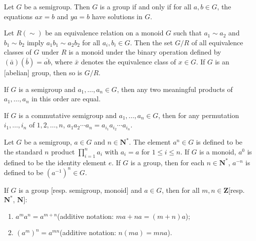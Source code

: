 \begin{proposition}
    Let $G$ be a semigroup. Then $G$ is a group if and only if for all $a,b\in G$, the equations $ax=b$ and $ya=b$ have solutions in $G$.
\end{proposition}

\begin{theorem}
    Let $R(\sim)$ be an equivalence relation on a monoid $G$ such that $a_{1}\sim a_{2}$ and $b_{1}\sim b_{2}$ imply $a_{1}b_{1}\sim a_{2}b_{2}$ for all $a_{i},b_{i}\in G$. Then the set $G /R$ of all equivalence classes of $G$ under $R$ is a monoid under the binary operation defined by $(\bar{a})(\bar{b})=\bar{ab}$, where $\bar{x}$ denotes the equivalence class of $x\in G$. If $G$ is an [abelian] group, then so is $G /R$.
\end{theorem}

\begin{theorem}
    If $G$ is a semigroup and $a_{1},\dots,a_{n}\in G$, then any two meaningful products of $a_{1},\dots,a_{n}$ in this order are equal.
\end{theorem}

\begin{corollary}
    If $G$ is a commutative semigroup and $a_{1},\dots,a_{n}\in G$, then for any permutation $i_{1},\dots,i_{n}$ of $1,2,\dots,n$, $a_{1}a_{2}\cdots a_{n}=a_{i_{1}}a_{i_{2}}\cdots a_{i_{n}}$.
\end{corollary}

\begin{definition}
    Let $G$ be a semigroup, $a\in G$ and $n\in \mathbf{N}^{*}$. The element $a^{n}\in G$ is defined to be the standard $n$ product $\prod\limits_{i=1}^{n}a_{i}$ with $a_{i}=a$ for $1\leq i\leq n$. If $G$ is a monoid, $a^{0}$ is defined to be the identity element $e$. If $G$ is a group, then for each $n\in \mathbf{N}^{*}$, $a^{-n}$ is defined to be $(a^{-1})^{n}\in G$.
\end{definition}

\begin{theorem}
    If $G$ is a group [resp. semigroup, monoid] and $a\in G$, then for all $m,n\in\mathbf{Z}$[resp. $\mathbf{N}^{*}$, $\mathbf{N}$]:
    \begin{enumerate}[i]
        \item $a^{m}a^{n}=a^{m+n}$(additive notation: $ma+na=(m+n)a$);
        \item $(a^{m})^{n}=a^{mn}$(additive notation: $n(ma)=mna$).
    \end{enumerate}
\end{theorem}